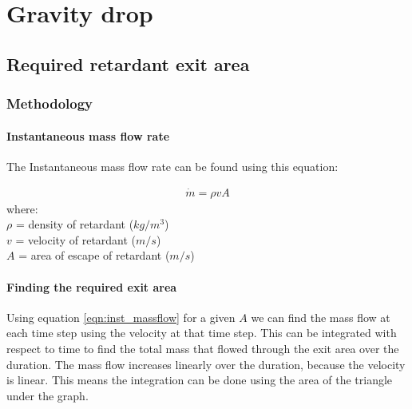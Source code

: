 \chapter{Gravity drop}
\section{Required retardant exit area}
\subsection{Methodology}



\subsubsection{Instantaneous mass flow rate}
The Instantaneous mass flow rate can be found using this equation:

\begin{equation}
\label{eqn:inst_massflow}
\begin{split}
  \dot{m} = \rho v A 
\end{split}
\end{equation}
where: \\
\indent $\rho$ = density of retardant ($kg/m^{3}$) \\ 
\indent $v$ = velocity of retardant ($m/s$) \\ 
\indent $A$ = area of escape of retardant ($m/s$) \\ 

\subsubsection{Finding the required exit area}
\noindent Using equation \ref{eqn:inst_massflow} for a given $A$ we can find the mass flow at each time step using the velocity at that time step.
This can be integrated with respect to time to find the total mass that flowed through the exit area over the duration.
The mass flow increases linearly over the duration, because the velocity is linear. This means the integration can be done using the area of the triangle under the graph. \\ 

